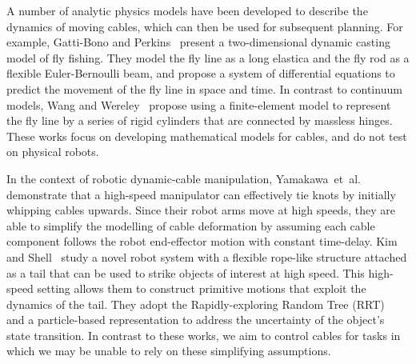 \documentclass[letterpaper, 10 pt, conference]{ieeeconf}  %
\newcommand{\remark}[3]{{\color{#2}[#1: #3]}}
\newcommand{\raven}[1]{\remark{Raven}{britishracinggreen}{#1}}
\begin{document}
A number of analytic physics models have been developed to describe the dynamics of moving cables, which can then be used for subsequent planning. For example, Gatti-Bono and Perkins~\cite{fly_fishing_2004} present a two-dimensional dynamic casting model of fly fishing. They model the fly line as a long elastica and the fly rod as a flexible Euler-Bernoulli beam, and propose a system of differential equations to predict the movement of the fly line in space and time. 
In contrast to continuum models, Wang and Wereley~\cite{wang2011analysis} propose using a finite-element model to represent the fly line by a series of rigid cylinders that are connected by massless hinges. These works focus on developing mathematical models for cables, and do not test on physical robots.

In the context of robotic dynamic-cable manipulation,
Yamakawa~et~al.~\cite{dynamic_knotting_2010,yamakawa2012simple,high_speed_knotting_2013,one_hand_knotting_tactile_2007} demonstrate that a high-speed manipulator can effectively tie knots by initially whipping cables upwards. Since their robot arms move at high speeds, they are able to simplify the modelling of cable deformation by assuming each cable component follows the robot end-effector motion with constant time-delay. Kim and Shell~\cite{kim2016using} study a novel robot system with a flexible rope-like structure attached as a tail that can be used to strike objects of interest at high speed. This high-speed setting allows them to construct primitive motions that exploit the dynamics of the tail. They adopt the Rapidly-exploring Random Tree (RRT)~\cite{RRT_2001} and a particle-based representation to address the uncertainty of the object’s state transition. In contrast to these works, we aim to control cables for tasks in which we may be unable to rely on these simplifying assumptions.

\end{document}

